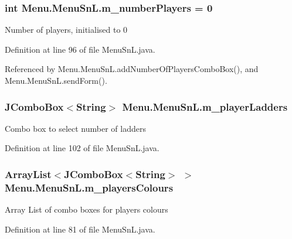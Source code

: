 \subsubsection[{m\+\_\+number\+Players}]{\setlength{\rightskip}{0pt plus 5cm}int Menu.\+Menu\+Sn\+L.\+m\+\_\+number\+Players = 0\hspace{0.3cm}{\ttfamily [private]}}\label{class_menu_1_1_menu_sn_l_afee3307aa062adfbee4edd14484c8f2c}
Number of players, initialised to 0 

Definition at line 96 of file Menu\+Sn\+L.\+java.



Referenced by Menu.\+Menu\+Sn\+L.\+add\+Number\+Of\+Players\+Combo\+Box(), and Menu.\+Menu\+Sn\+L.\+send\+Form().

\hypertarget{class_menu_1_1_menu_sn_l_a75cae58abbeef1dc893ab2214f84aaad}{}
\subsubsection[{m\+\_\+player\+Ladders}]{\setlength{\rightskip}{0pt plus 5cm}J\+Combo\+Box$<$String$>$ Menu.\+Menu\+Sn\+L.\+m\+\_\+player\+Ladders\hspace{0.3cm}{\ttfamily [private]}}\label{class_menu_1_1_menu_sn_l_a75cae58abbeef1dc893ab2214f84aaad}
Combo box to select number of ladders 

Definition at line 102 of file Menu\+Sn\+L.\+java.

\hypertarget{class_menu_1_1_menu_sn_l_a99b5b387a1ff9257d77534ebff7ca370}{}
\subsubsection[{m\+\_\+players\+Colours}]{\setlength{\rightskip}{0pt plus 5cm}Array\+List$<$J\+Combo\+Box$<$String$>$ $>$ Menu.\+Menu\+Sn\+L.\+m\+\_\+players\+Colours\hspace{0.3cm}{\ttfamily [private]}}\label{class_menu_1_1_menu_sn_l_a99b5b387a1ff9257d77534ebff7ca370}
Array List of combo boxes for player\textquotesingle{}s colours 

Definition at line 81 of file Menu\+Sn\+L.\+java.


